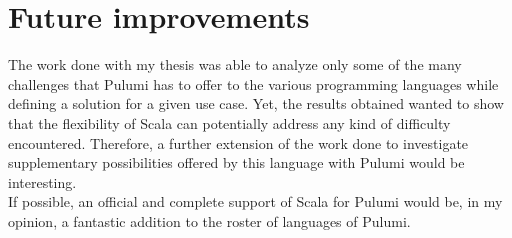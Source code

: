 \section{Future improvements}
The work done with my thesis was able to analyze only some of the many challenges that Pulumi has to offer to the various programming languages while defining a solution for a given use case.
Yet, the results obtained wanted to show that the flexibility of Scala can potentially address any kind of difficulty encountered.
Therefore, a further extension of the work done to investigate supplementary possibilities offered by this language with Pulumi would be interesting.\\
If possible, an official and complete support of Scala for Pulumi would be, in my opinion, a fantastic addition to the roster of languages of Pulumi.

